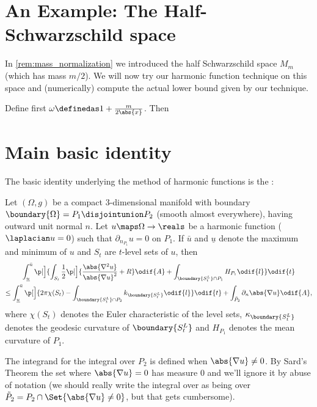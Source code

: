 \documentclass[titlepage,numbers=noenddot,headinclude,oneside,%
footinclude=true,cleardoublepage=empty,%
BCOR=5mm,paper=a4,fontsize=11pt,%
english,%
]{scrartcl}
\begin{document}

\section{An Example: The Half-Schwarzschild space}
In \cref{rem:mass_normalization} we introduced the half Schwarzschild space \( M_m \) (which has mass \( m/2 \)). We will now try our harmonic function technique on this space and (numerically) compute the actual lower bound given by our technique.

Define first \( \omega\definedas 1+\frac{m}{2\abs{x}} \). Then
\section{Main basic identity}
The basic identity underlying the method of harmonic functions is the \cite[Proposition 4.2]{brayHarmonicFunctionsMass2019}:
{\newcommand{\maxu}{\bar{u}}
\newcommand{\minu}{\underline{u}}
\newcommand{\nonzeroboundary}{\partial_{\neq 0}\Omega}
\begin{proposition}\label{prop:main_identity}
    Let \( (\Omega,g) \) be a compact 3-dimensional manifold with boundary \( \boundary{\Omega}=P_1\disjointunion P_2 \) (smooth almost everywhere), having outward unit normal \( n \). Let \( u\maps \Omega\to \reals \) be a harmonic function (\ie \( \laplacian u=0 \)) such that \( \partial_{n_{P_1}}u=0 \) on \( P_1 \). If \( \maxu \) and \( \minu \) denote the maximum and minimum of \( u \) and \( S_t \) are \( t \)-level sets of \( u \), then
    \begin{multline*}
        \int_{\minu}^{\maxu} \p[\Big]{\int_{S_t} \frac{1}{2}\p[\Big]{\frac{\abs{\nabla^2 u}}{\abs{\nabla u}^2}+R }\odif{A}+\int_{\boundary{S_t^L}\cap P_1}H_{P_1}\odif{l}}\odif{t}\\
        \leq\int_{\minu}^{\maxu}\p[\Big]{2\pi \chi(S_t)-\int _{\boundary{S_t^L} \cap P_2}k_{\boundary{S_t^L}}\odif{l}}\odif{t}+ \int_{\tilde{P}_2}\partial_{n} \abs{\nabla u}\odif{A},
    \end{multline*} 
    where \( \chi(S_t) \) denotes the Euler characteristic of the level sets, \( \kappa_{\boundary{S_t^L}} \) denotes the geodesic curvature of \( \boundary{S_t^L} \) and \( H_{P_1} \) denotes the mean curvature of \( P_1 \).

    The integrand for the integral over \( P_2 \) is defined when \( \abs{\nabla u}\neq 0 \). By Sard's Theorem \parencite{sardMeasureCriticalValues1942} the set where \( \abs{\nabla u}=0 \) has measure \( 0 \) and we'll ignore it by abuse of notation (we should really write the integral over as being over \( \tilde{P}_2=P_2\cap \Set{\abs{\nabla u}\neq 0} \), but that gets cumbersome).
\end{proposition}
}
\end{document}
